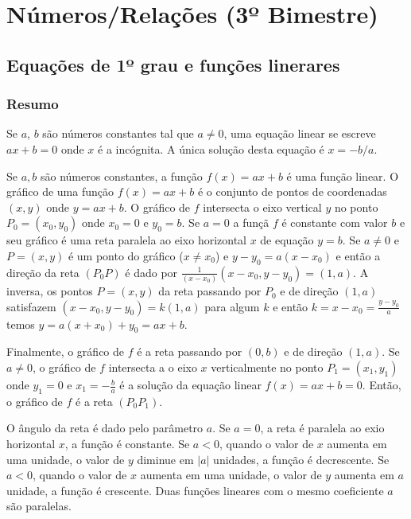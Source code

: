 \chapter{Números/Relações (3º Bimestre)}

\section{Equações de 1º grau e funções linerares}

\subsection*{Resumo}

Se $a$, $b$ são números constantes tal que $a \neq 0$, uma equação linear se
escreve $a x + b = 0$ onde $x$ é a incógnita. A única solução desta equação é $x
= - b / a$.

Se $a, b$ são números constantes, a função $f(x) = a x + b$ é uma função linear.
O gráfico de uma função $f(x) = a x + b$ é o conjunto de pontos de coordenadas
$(x, y)$ onde $y = a x + b$. O gráfico de $f$ intersecta o eixo vertical $y$
no ponto $P_0 = (x_0, y_0)$ onde $x_0 = 0$ e $y_0 = b$. Se $a = 0$ a funçã $f$ é
constante com valor $b$ e seu gráfico é uma reta paralela ao eixo horizontal $x$
de equação $y = b$. Se $a \neq 0$ e $P = (x, y)$ é um ponto do gráfico ($x \neq
x_0$) e $y - y_0 = a {(x - x_0)}$ e então a direção da reta $(P_0P)$ é dado por
$\frac{1}{{(x - x_0)}} ({x - x_0}, {y - y_0}) = {(1,a)}$. A inversa, os pontos
$P = (x, y)$ da reta passando por $P_0$ e de direção $(1, a)$ satisfazem
$({x - x_0}, {y - y_0}) = k {(1,a)}$ para algum $k$ e então
$k = x - x_0 = \frac{y - y_0}{a}$ temos $y = a {(x + x_0)} + y_0 = a x + b$.

Finalmente, o gráfico de $f$ é a reta passando por $(0, b)$ e de direção $(1,
a)$. Se $a \neq 0$, o gráfico de $f$ intersecta a o eixo $x$ verticalmente no
ponto $P_1 = (x_1, y_1)$ onde $y_1 = 0$ e $x_1 = -\frac{b}{a}$ é a solução da
equação linear $f(x) = ax + b = 0$.  Então, o gráfico de $f$ é a reta
$(P_0P_1)$.

O ângulo da reta é dado pelo parâmetro $a$. Se $a = 0$, a reta é paralela ao
exio horizontal $x$, a função é constante. Se $a < 0$, quando o valor de $x$
aumenta em uma unidade, o valor de $y$ diminue em $|a|$ unidades, a função é
decrescente.
Se $a < 0$, quando o valor de $x$ aumenta em uma unidade, o valor de $y$ aumenta
em $a$ unidade, a função é crescente. Duas funções lineares com o mesmo
coeficiente $a$ são paralelas.

